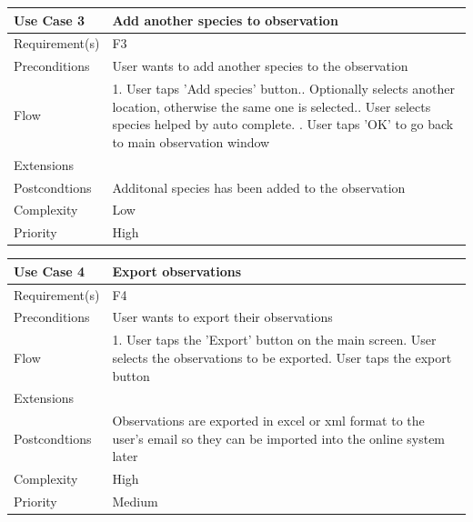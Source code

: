 \begin{tabular}[t]{|l|p{}|}\hline
	Use Case 3&Add another species to observation\\\hline
	Requirement(s)&F3\\\hline
	Preconditions&User wants to add another species to the observation\\\hline
	Flow&1. User taps 'Add species' button.\newline
	2. Optionally selects another location, otherwise the same one is selected.\newline
	3. User selects species helped by auto complete. \newline
	4. User taps 'OK' to go back to main observation window \\\hline  
	Extensions& \\\hline
	Postcondtions&Additonal species has been added to the observation\\\hline
	Complexity&Low\\\hline
	Priority&High\\\hline
\end{tabular}

\hspace{2em}

\begin{tabular}[t]{|l|p{}|}\hline
	Use Case 4&Export  observations\\\hline
	Requirement(s)&F4\\\hline
	Preconditions& User wants to export their observations \\\hline
	Flow&1. User taps the 'Export' button on the main screen\newline
	2. User selects the observations to be exported\newline
	3. User taps the export button\\\hline
	Extensions& \\\hline
	Postcondtions&Observations are exported in excel or xml format to the user's email so they can be imported into the online system later\\\hline
	Complexity&High\\\hline
	Priority&Medium\\\hline
\end{tabular}

\hspace{2em}

